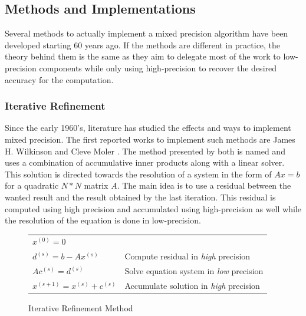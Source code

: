 
\subsection{Methods and Implementations}
Several methods to actually implement a mixed precision algorithm have been developed starting 60 years ago. If the methods are different in practice, the theory behind them is the same as they aim to delegate most of the work to low-precision components while only using high-precision to recover the desired accuracy for the computation.


\subsubsection{Iterative Refinement}

Since the early 1960's, literature has studied the effects and ways to implement mixed precision. The first reported works to implement such methods are James H. Wilkinson \cite{Wilkinson1994} and Cleve Moler \cite{Moler1967}. The method presented by both is named  and uses a combination of accumulative inner products along with a linear solver. This solution is directed towards the resolution of a system in the form of $Ax=b$ for a quadratic $N*N$ matrix $A$. The main idea is to use a residual between the wanted result and the result obtained by the last iteration. This residual is computed using high precision and accumulated using high-precision as well while the resolution of the equation is done in low-precision.

\begin{figure}[htbp]
	\centering
\begin{tabular}{ll}
	$x^{(0)}=0$ &\\
	$d^{(s)}=b-Ax^{(s)}$ & Compute residual in \emph{high} precision\\
	$Ac^{(s)}=d^{(s)}$ & Solve equation system in \emph{low} precision\\
	$x^{(s+1)}=x^{(s)}+c^{(s)}$ & Accumulate solution in \emph{high} precision\\
\end{tabular}
	\caption[Iterative Refinement]{Iterative Refinement Method \cite{Goddeke2007}}
	\label{fig:IterativeRef}
\end{figure}

